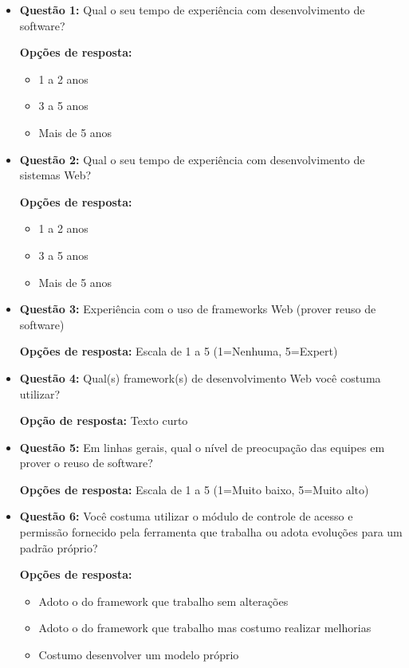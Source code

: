 \begin{itemize}

\item \textbf{Questão 1:} Qual o seu tempo de experiência com desenvolvimento de software?

\textbf{Opções de resposta:} 
\begin{itemize}
\item 1 a 2 anos
\item 3 a 5 anos
\item Mais de 5 anos
\end{itemize}

\item \textbf{Questão 2:} Qual o seu tempo de experiência com desenvolvimento de sistemas Web?

\textbf{Opções de resposta:}
\begin{itemize}
\item 1 a 2 anos
\item 3 a 5 anos
\item Mais de 5 anos
\end{itemize}

\item \textbf{Questão 3:} Experiência com o uso de frameworks Web (prover reuso de software)

\textbf{Opções de resposta:} Escala de 1 a 5 (1=Nenhuma, 5=Expert)

\item \textbf{Questão 4:} Qual(s) framework(s) de desenvolvimento Web você costuma utilizar?

\textbf{Opção de resposta:} Texto curto

\item \textbf{Questão 5:} Em linhas gerais, qual o nível de preocupação das equipes em prover o reuso de software?

\textbf{Opções de resposta:} Escala de 1 a 5 (1=Muito baixo, 5=Muito alto)

\item \textbf{Questão 6:} Você costuma utilizar o módulo de controle de acesso e permissão fornecido pela ferramenta que trabalha ou adota evoluções para um padrão próprio?

\textbf{Opções de resposta:} 
\begin{itemize}
\item Adoto o do framework que trabalho sem alterações
\item Adoto o do framework que trabalho mas costumo realizar melhorias
\item Costumo desenvolver um modelo próprio
\end{itemize}


\end{itemize}
